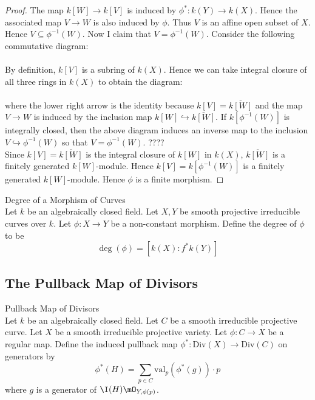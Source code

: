\documentclass[a4paper]{article}
\begin{document}
\begin{prp}{}{}
\begin{proof}
The map $k[W]\to k[V]$ is induced by $\phi^\ast:k(Y)\to k(X)$. Hence the associated map $V\to W$ is also induced by $\phi$. Thus $V$ is an affine open subset of $X$. Hence $V\subseteq\phi^{-1}(W)$. Now I claim that $V=\phi^{-1}(W)$. Consider the following commutative diagram: \\
\\
By definition, $k[V]$ is a subring of $k(X)$. Hence we can take integral closure of all three rings in $k(X)$ to obtain the diagram: \\
\\
where the lower right arrow is the identity because $k[V]=\overline{k[W]}$ and the map $V\to W$ is induced by the inclusion map $k[W]\hookrightarrow\overline{k[W]}$. If $k[\phi^{-1}(W)]$ is integrally closed, then the above diagram induces an inverse map to the inclusion $V\hookrightarrow\phi^{-1}(W)$ so that $V=\phi^{-1}(W)$. ????\\

Since $k[V]=\overline{k[W]}$ is the integral closure of $k[W]$ in $k(X)$, $\overline{k[W]}$ is a finitely generated $k[W]$-module. Hence $k[V]=k[\phi^{-1}(W)]$ is a finitely generated $k[W]$-module. Hence $\phi$ is a finite morphism. 
\end{proof}
\end{prp}

\begin{defn}{Degree of a Morphism of Curves}{}\\
Let $k$ be an algebraically closed field. Let $X,Y$ be smooth projective irreducible curves over $k$. Let $\phi:X\to Y$ be a non-constant morphism. Define the degree of $\phi$ to be $$\deg(\phi)=[k(X):f^\ast k(Y)]$$
\end{defn}

\subsection{The Pullback Map of Divisors}
\begin{defn}{Pullback Map of Divisors}{}\\
Let $k$ be an algebraically closed field. Let $C$ be a smooth irreducible projective curve. Let $X$ be a smooth irreducible projective variety. Let $\phi:C\to X$ be a regular map. Define the induced pullback map $\phi^\ast:\text{Div}(X)\to\text{Div}(C)$ on generators by $$\phi^\ast(H)=\sum_{p\in C}\text{val}_p(\phi^\ast(g))\cdot p$$ where $g$ is a generator of $\I(H)\mO_{Y,\phi(p)}$. 
\end{defn}
\end{document}
